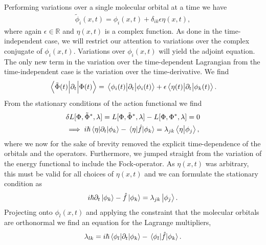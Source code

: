     Performing variations over a single molecular orbital at a time we have
    \begin{align}
        \tilde{\phi}_i(x, t)
        = \phi_i(x, t) + \delta_{ik}\epsilon\eta(x, t),
    \end{align}
    where again $\epsilon \in \mathbb{R}$ and $\eta(x, t)$ is a complex
    function.
    As done in the time-independent case, we will restrict our attention to
    variations over the complex conjugate of $\phi_i(x, t)$.
    Variations over $\phi_i(x, t)$ will yield the adjoint equation.
    The only new term in the variation over the time-dependent Lagrangian from
    the time-independent case is the variation over the time-derivative.
    We find
    \begin{align}
        \mel{\tilde{\Phi}(t)}{\partial_t}{\Phi(t)}
        = \mel{\phi_i(t)}{\partial_t}{\phi_i(t)}
        + \epsilon\mel{\eta(t)}{\partial_t}{\phi_k(t)}.
    \end{align}
    From the stationary conditions of the action functional we find
    \begin{gather}
        \delta L[\Phi, \tilde{\Phi}^{*}, \lambda]
        = L[\Phi, \tilde{\Phi}^{*}, \lambda]
        - L[\Phi, \Phi^{*}, \lambda]
        = 0 \\
        \implies
        i\hslash\mel{\eta}{\partial_t}{\phi_k}
        -\mel{\eta}{\hat{f}}{\phi_k}
        = \lambda_{jk}\braket{\eta}{\phi_j},
    \end{gather}
    where we now for the sake of brevity removed the explicit time-dependence of
    the orbitals and the operators.
    Furthermore, we jumped straight from the variation of the energy functional
    to include the Fock-operator.
    As $\eta(x, t)$ was arbitrary, this must be valid for all choices of
    $\eta(x, t)$ and we can formulate the stationary condition as
    \begin{align}
        i\hslash\partial_t\ket{\phi_k}
        - \hat{f}\ket{\phi_k}
        = \lambda_{jk}\ket{\phi_j}.
        \label{eq:stationary-condition-1}
    \end{align}
    Projecting onto $\phi_l(x, t)$ and applying the constraint that the
    molecular orbitals are orthonormal we find an equation for the Lagrange
    multipliers,
    \begin{align}
        \lambda_{lk}
        = i\hslash\mel{\phi_l}{\partial_t}{\phi_k}
        - \mel{\phi_l}{\hat{f}}{\phi_k}.
    \end{align}
